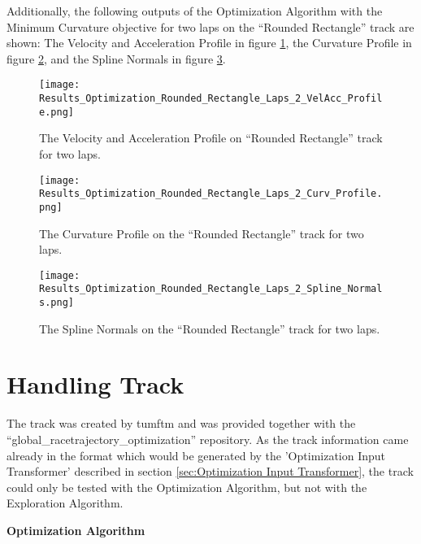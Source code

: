 Additionally, the following outputs of the Optimization Algorithm with the Minimum Curvature objective for two laps on the ``Rounded Rectangle'' track are shown: The Velocity and Acceleration Profile in figure \ref{fig:Results Rounded Rectangle Laps 2 VelAcc Profile}, the Curvature Profile in figure \ref{fig:Results Rounded Rectangle Laps 2 Curv Profile}, and the Spline Normals in figure \ref{fig:Results Rounded Rectangle Laps 2 Spline Normals}.
\begin{figure}[H]
    \centering
    \texttt{[image: Results\_Optimization\_Rounded\_Rectangle\_Laps\_2\_VelAcc\_Profile.png]}
    \caption{The Velocity and Acceleration Profile on ``Rounded Rectangle'' track for two laps.}
    \label{fig:Results Rounded Rectangle Laps 2 VelAcc Profile}
\end{figure}
\begin{figure}[H]
    \centering
    \texttt{[image: Results\_Optimization\_Rounded\_Rectangle\_Laps\_2\_Curv\_Profile.png]}
    \caption{The Curvature Profile on the ``Rounded Rectangle'' track for two laps.}
    \label{fig:Results Rounded Rectangle Laps 2 Curv Profile}
\end{figure}
\begin{figure}[H]
    \centering
    \texttt{[image: Results\_Optimization\_Rounded\_Rectangle\_Laps\_2\_Spline\_Normals.png]}
    \caption{The Spline Normals on the ``Rounded Rectangle'' track for two laps.}
    \label{fig:Results Rounded Rectangle Laps 2 Spline Normals}
\end{figure}

\pagebreak

\section{Handling Track} \label{sec:Results Handling Track}
The track was created by \acrshort{tumftm} and was provided together with the ``global\_racetrajectory\_optimization'' repository. \cite{tumftm_optimization_algoritm}
As the track information came already in the format which would be generated by the 'Optimization Input Transformer' described in section \ref{sec:Optimization Input Transformer}, the track could only be tested with the Optimization Algorithm, but not with the Exploration Algorithm.

\textbf{Optimization Algorithm}

